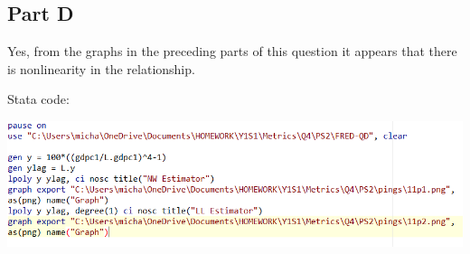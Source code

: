 \documentclass[11pt]{article} %
\begin{document}
\subsection{Part D}
Yes, from the graphs in the preceding parts of this question it appears that there is nonlinearity in the relationship.

Stata code:

\includegraphics[scale=0.7]{code11}
\end{document}
